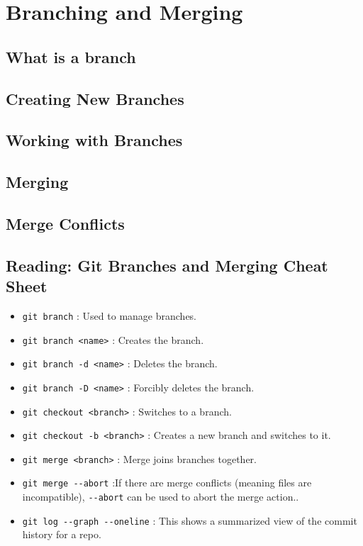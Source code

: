 \section{Branching and Merging}

	\subsection{What is a branch}
	
	\subsection{Creating New Branches}
	
	\subsection{Working with Branches}
	
	\subsection{Merging}
	
	\subsection{Merge Conflicts}

	\subsection{Reading: Git Branches and Merging Cheat Sheet}

	\begin{itemize}
		\item \verb|git branch| : Used to manage branches.

		\item \verb|git branch <name>| : Creates the branch.
		
		\item \verb|git branch -d <name>| : Deletes the branch.

		\item \verb|git branch -D <name>| : Forcibly deletes the branch.

		\item \verb|git checkout <branch>| : Switches to a branch.

		\item \verb|git checkout -b <branch>| : Creates a new branch and switches to it.
		
		\item \verb|git merge <branch>| : Merge joins branches together.
		
		\item \verb|git merge --abort| :If there are merge conflicts (meaning files are incompatible), \verb|--abort| can be used to abort the merge action..
		
		\item \verb|git log --graph --oneline| : This shows a summarized view of the commit history for a repo.\textbf{}
	\end{itemize}	



